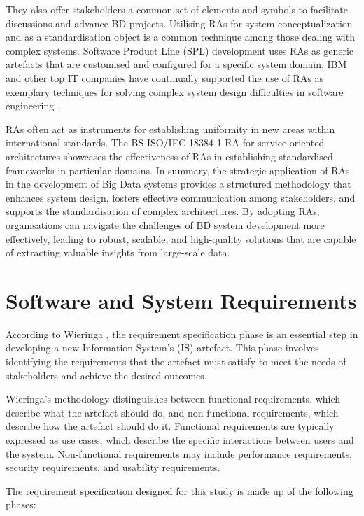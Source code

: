 \documentclass[preprint,12pt]{elsarticle}
\begin{document}
They also offer stakeholders a common set of elements and symbols to facilitate discussions and advance BD projects. Utilising RAs for system conceptualization and as a standardisation object is a common technique among those dealing with complex systems. Software Product Line (SPL) development uses RAs as generic artefacts that are customised and configured for a specific system domain. IBM and other top IT companies have continually supported the use of RAs as exemplary techniques for solving complex system design difficulties in software engineering \cite{ataei2022state}. 

RAs often act as instruments for establishing uniformity in new areas within international standards. The BS ISO/IEC 18384-1 RA \cite{Iso18384-1} for service-oriented architectures showcases the effectiveness of RAs in establishing standardised frameworks in particular domains. In summary, the strategic application of RAs in the development of Big Data systems provides a structured methodology that enhances system design, fosters effective communication among stakeholders, and supports the standardisation of complex architectures. By adopting RAs, organisations can navigate the challenges of BD system development more effectively, leading to robust, scalable, and high-quality solutions that are capable of extracting valuable insights from large-scale data.

\section{Software and System Requirements}

\label{sec:software_and_system_requirements}

According to Wieringa \cite{wieringa2014design}, the requirement specification phase is an essential step in developing a new Information System's (IS) artefact. This phase involves identifying the requirements that the artefact must satisfy to meet the needs of stakeholders and achieve the desired outcomes.

Wieringa's methodology distinguishes between functional requirements, which describe what the artefact should do, and non-functional requirements, which describe how the artefact should do it. Functional requirements are typically expressed as use cases, which describe the specific interactions between users and the system. Non-functional requirements may include performance requirements, security requirements, and usability requirements.

The requirement specification designed for this study is made up of the following phases: 
\end{document}
